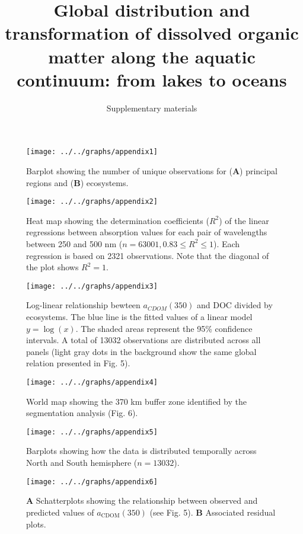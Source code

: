 \documentclass[12pt,a4paper]{scrartcl}
\title{Global distribution and transformation of dissolved organic matter along the aquatic continuum: from lakes to oceans}
\subtitle{Supplementary materials}
\date{}
\begin{document}
\maketitle

\begin{figure}[h]
	\centering
	\texttt{[image: ../../graphs/appendix1]}
	\caption{Barplot showing the number of unique observations for (\textbf{A}) principal regions and (\textbf{B}) ecosystems.}
\end{figure}

\clearpage
\newpage



\clearpage
\newpage

\begin{figure}[h]
	\centering
	\texttt{[image: ../../graphs/appendix2]}
	\caption{Heat map showing the determination coefficients ($R^2$) of the linear regressions between absorption values for each pair of wavelengths between 250 and 500 nm ($n = 63001, 0.83 \le R^2 \le 1$). Each regression is based on 2321 observations. Note that the diagonal of the plot shows $R^2 = 1$. }
\end{figure}

\clearpage
\newpage

\begin{figure}[h]
	\centering
	\texttt{[image: ../../graphs/appendix3]}

	\caption{Log-linear relationship bewteen $a_{CDOM}(350)$ and DOC divided by ecosystems. The blue line is the fitted values of a linear model $y = \log(x)$. The shaded areas represent the 95\% confidence intervals. A total of 13032 observations are distributed across all panels (light gray dots in the background show the same global relation presented in Fig. 5).}
\end{figure}

\clearpage
\newpage

\begin{figure}[h]
	\centering
	\texttt{[image: ../../graphs/appendix4]}
	\caption{World map showing the 370 km buffer zone identified by the segmentation analysis (Fig. 6).}
\end{figure}

\clearpage
\newpage

\begin{figure}[h]
	\centering
	\texttt{[image: ../../graphs/appendix5]}
	\caption{Barplots showing how the data is distributed temporally across North and South hemisphere ($n = 13032$).}
\end{figure}


\clearpage
\newpage

\begin{figure}[h]
	\centering
	\texttt{[image: ../../graphs/appendix6]}
	\caption{\textbf{A} Schatterplots showing the relationship between observed and predicted values of $a_{\text{CDOM}}(350)$ (see Fig. 5). \textbf{B} Associated residual plots.}
\end{figure}
\end{document}
